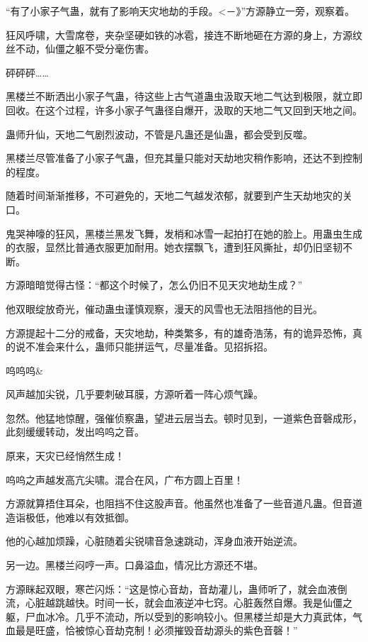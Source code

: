 
\begin{this_body}

“有了小家子气蛊，就有了影响天灾地劫的手段。<－》”方源静立一旁，观察着。

狂风呼啸，大雪席卷，夹杂坚硬如铁的冰雹，接连不断地砸在方源的身上，方源纹丝不动，仙僵之躯不受分毫伤害。

砰砰砰……

黑楼兰不断洒出小家子气蛊，待这些上古气道蛊虫汲取天地二气达到极限，就立即回收。在这个过程，许多小家子气蛊径自爆开，汲取的天地二气又回到天地之间。

蛊师升仙，天地二气剧烈波动，不管是凡蛊还是仙蛊，都会受到反噬。

黑楼兰尽管准备了小家子气蛊，但充其量只能对天劫地灾稍作影响，还达不到控制的程度。

随着时间渐渐推移，不可避免的，天地二气越发浓郁，就要到产生天劫地灾的关口。

鬼哭神嚎的狂风，黑楼兰黑发飞舞，发梢和冰雪一起拍打在她的脸上。用蛊虫生成的衣服，显然比普通衣服更加耐用。她衣摆飘飞，遭到狂风撕扯，却仍旧坚韧不断。

方源暗暗觉得古怪：“都这个时候了，怎么仍旧不见天灾地劫生成？”

他双眼绽放奇光，催动蛊虫谨慎观察，漫天的风雪也无法阻挡他的目光。

方源提起十二分的戒备，天灾地劫，种类繁多，有的雄奇浩荡，有的诡异恐怖，真的说不准会来什么，蛊师只能拼运气，尽量准备。见招拆招。

呜呜呜\&

风声越加尖锐，几乎要刺破耳膜，方源听着一阵心烦气躁。

忽然。他猛地惊醒，强催侦察蛊，望进云层当去。顿时见到，一道紫色音磬成形，此刻缓缓转动，发出呜呜之音。

原来，天灾已经悄然生成！

呜呜之声越发高亢尖啸。混合在风，广布方圆上百里！

方源就算捂住耳朵，也阻挡不住这股声音。他虽然也准备了一些音道凡蛊。但音道造诣极低，他难以有效抵御。

他的心越加烦躁，心脏随着尖锐啸音急速跳动，浑身血液开始逆流。

另一边。黑楼兰闷哼一声。口鼻溢血，情况比方源还不堪。

方源眯起双眼，寒芒闪烁：“这是惊心音劫，音劫灌儿，蛊师听了，就会血液倒流，心脏越跳越快。时间一长，就会血液逆冲七窍。心脏轰然自爆。我是仙僵之躯，尸血冰冷。几乎不流动，所以受到的影响较小。但黑楼兰却是大力真武体，气血最是旺盛，恰被惊心音劫克制！必须摧毁音劫源头的紫色音磬！”


\end{this_body}
